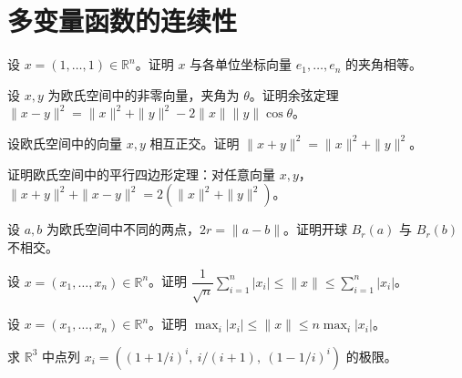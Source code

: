 \renewcommand{\thesection}{\arabic{section}}\renewcommand{\theHsection}{chapter.\arabic{section}}\setcounter{section}{7}\section{多变量函数的连续性}
\noindent\begin{minipage}{\textwidth}
设 $x=(1,\ldots,1)\in\mathbb R^n$。证明 $x$ 与各单位坐标向量 $e_1,\ldots,e_n$ 的夹角相等。
\end{minipage}\par\vfill
\noindent\begin{minipage}{\textwidth}
设 $x,y$ 为欧氏空间中的非零向量，夹角为 $\theta$。证明余弦定理 $\|x-y\|^2=\|x\|^2+\|y\|^2-2\|x\|\|y\|\cos\theta$。
\end{minipage}\par\vfill
\noindent\begin{minipage}{\textwidth}
设欧氏空间中的向量 $x,y$ 相互正交。证明 $\|x+y\|^2=\|x\|^2+\|y\|^2$。
\end{minipage}\par\vfill
\newpage
\noindent\begin{minipage}{\textwidth}
证明欧氏空间中的平行四边形定理：对任意向量 $x,y$，$\|x+y\|^2+\|x-y\|^2=2(\|x\|^2+\|y\|^2)$。
\end{minipage}\par\vfill
\noindent\begin{minipage}{\textwidth}
设 $a,b$ 为欧氏空间中不同的两点，$2r=\|a-b\|$。证明开球 $B_r(a)$ 与 $B_r(b)$ 不相交。
\end{minipage}\par\vfill
\noindent\begin{minipage}{\textwidth}
设 $x=(x_1,\ldots,x_n)\in\mathbb R^n$。证明 $\dfrac1{\sqrt n}\sum_{i=1}^n|x_i|\le\|x\|\le\sum_{i=1}^n|x_i|$。
\end{minipage}\par\vfill
\newpage
\noindent\begin{minipage}{\textwidth}
设 $x=(x_1,\ldots,x_n)\in\mathbb R^n$。证明 $\max_i|x_i|\le\|x\|\le n\max_i|x_i|$。
\end{minipage}\par\vfill
\noindent\begin{minipage}{\textwidth}
求 $\mathbb R^3$ 中点列 $x_i=((1+1/i)^i,\ i/(i+1),\ (1-1/i)^i)$ 的极限。
\end{minipage}\par\vfill
